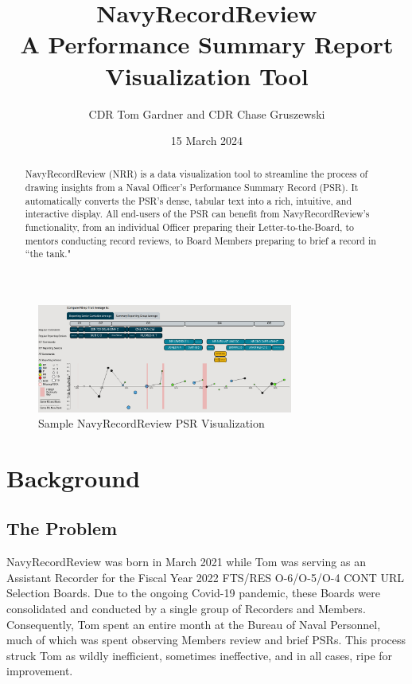\documentclass[UTF8]{article}
\begin{document}
\title{
  NavyRecordReview \\
  \large A Performance Summary Report Visualization Tool
}

\author{CDR Tom Gardner and CDR Chase Gruszewski}
\date{15 March 2024}
\maketitle


\begin{abstract}
NavyRecordReview (NRR) is a data visualization tool to streamline the process of
drawing insights from a Naval Officer's Performance Summary Record (PSR). It 
automatically converts the PSR's dense, tabular text into a rich, intuitive, 
and interactive display. All end-users of the PSR can benefit from 
NavyRecordReview's functionality, from an individual Officer preparing their
Letter-to-the-Board, to mentors conducting record reviews, to Board Members 
preparing to brief a record in ``the tank." 
\end{abstract}

\begin{figure}[h!]
 \centering
 \includegraphics[width=0.75\textwidth]{nrr_dashboard.png}
 \caption{Sample NavyRecordReview PSR Visualization}
\end{figure}


\section{Background}
\subsection{The Problem}
NavyRecordReview was born in March 2021 while Tom was serving as an Assistant
Recorder for the Fiscal Year 2022 FTS/RES O-6/O-5/O-4 CONT URL Selection Boards.
Due to the ongoing Covid-19 pandemic, these Boards were consolidated and
conducted by a single group of Recorders and Members. Consequently, Tom spent an
entire month at the Bureau of Naval Personnel, much of which was spent
observing Members review and brief PSRs. This process struck Tom as wildly
inefficient, sometimes ineffective, and in all cases, ripe for improvement.\\
\end{document}
